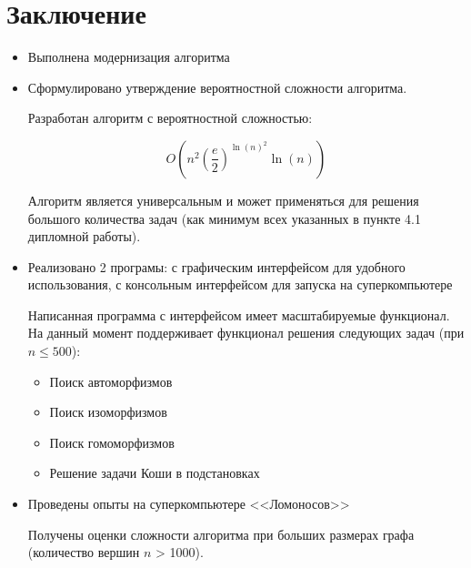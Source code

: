 \section*{Заключение}
\label{sec:Conclusion} 
\large

\begin{itemize}
\item Выполнена модернизация алгоритма
\item Сформулировано утверждение вероятностной сложности алгоритма.

Разработан алгоритм с вероятностной сложностью:

$$O(n^2(\frac{e}{2})^{\ln(n)^2} \ln(n))$$

Алгоритм является универсальным и может применяться для решения большого количества задач (как минимум всех указанных в пункте 4.1 дипломной работы).

\item Реализовано 2 програмы: с графическим интерфейсом для удобного использования, с консольным интерфейсом для запуска на суперкомпьютере

Написанная программа с интерфейсом имеет масштабируемые функционал. На данный момент поддерживает функционал решения следующих задач (при $n \leq  500$):

\begin{itemize}
\item Поиск автоморфизмов
\item Поиск изоморфизмов
\item Поиск гомоморфизмов
\item Решение задачи Коши в подстановках
\end{itemize}

\item Проведены опыты на суперкомпьютере <<Ломоносов>>

Получены оценки сложности алгоритма при больших размерах графа (количество вершин $n$ > 1000).

\end{itemize}

